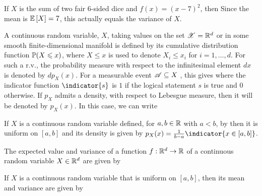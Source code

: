 \documentclass[letterpaper,10pt,english]{article}
\begin{document}
\begin{shaded*}\begin{exmp}
If $X$ is the sum of two fair 6-sided dice and $f(x) = (x - 7)^2$, 
then 
Since the mean is $\E{X} = 7$, this actually equals the variance of $X$.
\end{exmp}\end{shaded*}
\begin{defn} 
A continuous random variable, $X$, taking values on the set $\sX = \R^d$ or in some smooth finite-dimensional manifold is defined by its cumulative distribution function $\P(X \le x)$, where $X \le x$ is used to denote
$X_i \le x_i$ for $i = 1, \dots, d$. For such a r.v., the probability measure with respect to the
infinitesimal element $dx$ is denoted by $dp_X (x)$. 
For a measurable event $\sA \subseteq X$ , this gives 
where the indicator function $\indicator{s}$ is $1$ if the logical statement $s$ is true and $0$ otherwise. 
If $p_X$ admits a density, with respect to Lebesgue measure, then it will be denoted by $p_X(x)$. 
In this case, we can write
\end{defn}
\begin{shaded*}\begin{exmp}
If $X$ is a continuous random variable defined, for $a, b \in \R$ with $a < b$, by
then it is uniform on $[a, b]$ and its density is given by $p_X (x) = \frac{1}{b-a}\indicator{x \in [a,b]}$.
\end{exmp}\end{shaded*}

\begin{defn} 
The expected value and variance of a function $f : \R^d \to \R$ of a continuous
random variable $X \in \R^d$ are given by
\end{defn}
\begin{shaded*}\begin{exmp} 
If $X$ is a continuous random variable that is uniform on $[a, b]$, 
then its mean and variance are given by
\end{exmp}\end{shaded*}
     
\end{document}
